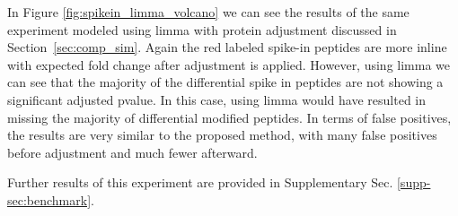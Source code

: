 \documentclass[mcp]{article}
\numberwithin{figure}{section} %
\numberwithin{table}{section}
\def\todo#1{{\color{red}[#1]}}
\begin{document}
In Figure \ref{fig:spikein_limma_volcano} we can see the results of the same experiment modeled using limma with protein adjustment discussed in Section~\ref{sec:comp_sim}. Again the red labeled spike-in peptides are more inline with expected fold change after adjustment is applied. However, using limma we can see that the majority of the differential spike in peptides are not showing a significant adjusted pvalue. In this case, using limma would have resulted in missing the majority of differential modified peptides.  In terms of false positives, the results are very similar to the proposed method, with many false positives before adjustment and much fewer afterward.

Further results of this experiment are provided in Supplementary Sec. \ref{supp-sec:benchmark}. 


\end{document}
